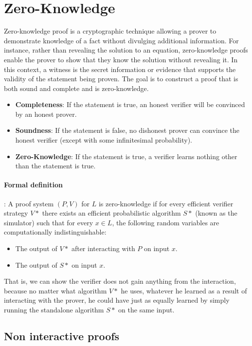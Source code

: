 \section{Zero-Knowledge}
Zero-knowledge proof is a cryptographic technique allowing a prover to demonstrate knowledge of a fact without divulging additional information. 
For instance, rather than revealing the solution to an equation, zero-knowledge proofs enable the prover to show that they know the solution without revealing it. 
In this context, a witness is the secret information or evidence that supports the validity of the statement being proven. 
The goal is to construct a proof that is both sound and complete and is zero-knowledge.


\label{subsec:zkp}
\begin{itemize}
\item \textbf{Completeness}: If the statement is true, an honest verifier will be convinced by an honest prover.
\item \textbf{Soundness}: If the statement is false, no dishonest prover can convince the honest verifier (except with some infinitesimal probability).
\item \textbf{Zero-Knowledge}: If the statement is true,  a verifier learns nothing other than the statement is true. \cite{LC23}
\end{itemize}

\paragraph{Formal definition}: A proof system $(P,V)$ for $L$ is zero-knowledge if for every efficient verifier strategy $V*$ there exists an efficient probabilistic algorithm $S*$ (known as the simulator) such that for every $x \in L$, 
the following random variables are computationally indistinguishable:
 \begin{itemize}
   \item The output of $V*$ after interacting with $P$ on input $x$.
   \item The output of $S*$ on input $x$.
\end{itemize}
That is, we can show the verifier does not gain anything from the interaction, because no matter what algorithm $V*$
 he uses, whatever he learned as a result of interacting with the prover, he could have just as equally learned by simply running the standalone algorithm $S*$
 on the same input. \cite{Barak16}

\subsection{Non interactive proofs}

